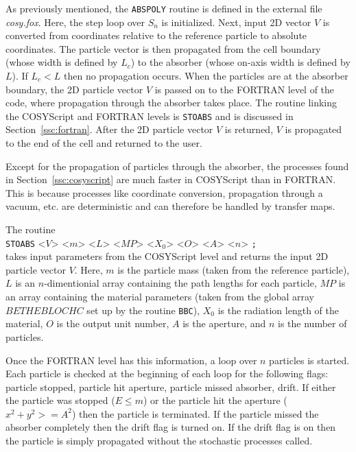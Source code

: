 \label{ssc:cosyscript}

As previously mentioned, the \texttt{ABSPOLY} routine is defined in the external file \textit{cosy.fox}. Here, the step loop over $S_n$ is initialized. Next, input 2D vector $V$ is converted from coordinates relative to the reference particle to absolute coordinates. The particle vector is then propagated from the cell boundary (whose width is defined by $L_c$) to the absorber (whose on-axis width is defined by $L$). If $L_c<L$ then no propagation occurs. When the particles are at the absorber boundary, the 2D particle vector $V$ is passed on to the FORTRAN level of the code, where propagation through the absorber takes place. The routine linking the COSYScript and FORTRAN levels is \texttt{STOABS} and is discussed in Section~\ref{ssc:fortran}. After the 2D particle vector $V$ is returned, $V$ is propagated to the end of the cell and returned to the user.

\label{ssc:fortran}

Except for the propagation of particles through the absorber, the processes found in Section~\ref{ssc:cosyscript} are much faster in COSYScript than in FORTRAN. This is because processes like coordinate conversion, propagation through a vacuum, etc. are deterministic and can therefore be handled by transfer maps.

The routine\\
\texttt{STOABS} <$V$> <$m$> <$L$> <$MP$> <$X_0$> <$O$> <$A$> <$n$> \texttt{;} \\
takes input parameters from the COSYScript level and returns the input 2D particle vector $V$. Here, $m$ is the particle mass (taken from the reference particle), $L$ is an $n$-dimentionial array containing the path lengths for each particle, $MP$ is an array containing the material parameters (taken from the global array $BETHEBLOCHC$ set up by the routine \texttt{BBC}), $X_0$ is the radiation length of the material, $O$ is the output unit number, $A$ is the aperture, and $n$ is the number of particles.

Once the FORTRAN level has this information, a loop over $n$ particles is started. Each particle is checked at the beginning of each loop for the following flags: particle stopped, particle hit aperture, particle missed absorber, drift. If either the particle was stopped ($E\leq m$) or the particle hit the aperture ($x^2+y^2>=A^2$) then the particle is terminated. If the particle missed the absorber completely then the drift flag is turned on. If the drift flag is on then the particle is simply propagated without the stochastic processes called.

